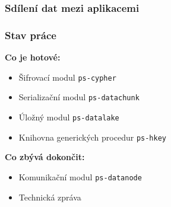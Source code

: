 \begin{frame}
  \frametitle{Sdílení dat mezi aplikacemi}
\end{frame}


\begin{frame}
  \frametitle{Stav práce}
  \textbf{Co je hotové:}
  \begin{itemize}
    \item Šifrovací modul \texttt{ps-cypher}
    \item Serializační modul \texttt{ps-datachunk}
    \item Úložný modul \texttt{ps-datalake}
    \item Knihovna generických procedur \texttt{ps-hkey}
  \end{itemize}
  \vspace{1em}
  \textbf{Co zbývá dokončit:}
  \begin{itemize}
    \item Komunikační modul \texttt{ps-datanode}
    \item Technická zpráva
  \end{itemize}
\end{frame}


